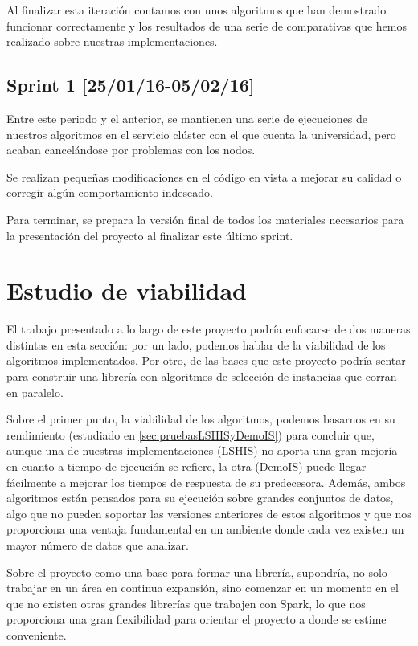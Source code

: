 Al finalizar esta iteración contamos con unos algoritmos que han demostrado funcionar correctamente y los resultados de una serie de comparativas que hemos realizado sobre nuestras implementaciones.

\subsection{Sprint 1 [25/01/16-05/02/16]}

Entre este periodo y el anterior, se mantienen una serie de ejecuciones de nuestros algoritmos en el servicio clúster con el que cuenta la universidad, pero acaban cancelándose por problemas con los nodos.

Se realizan pequeñas modificaciones en el código en vista a mejorar su calidad o corregir algún comportamiento indeseado.

Para terminar, se prepara la versión final de todos los materiales necesarios para la presentación del proyecto al finalizar este último sprint.


\section{Estudio de viabilidad}

El trabajo presentado a lo largo de este proyecto podría enfocarse de dos maneras distintas en esta sección: por un lado, podemos hablar de la viabilidad de los algoritmos implementados. Por otro, de las bases que este proyecto podría sentar para construir una librería con algoritmos de selección de instancias que corran en paralelo.

Sobre el primer punto, la viabilidad de los algoritmos, podemos basarnos en su rendimiento (estudiado en \ref{sec:pruebasLSHISyDemoIS}) para concluir que, aunque una de nuestras implementaciones (LSHIS) no aporta una gran mejoría en cuanto a tiempo de ejecución se refiere, la otra (DemoIS) puede llegar fácilmente a mejorar los tiempos de respuesta de su predecesora. Además, ambos algoritmos están pensados para su ejecución sobre grandes conjuntos de datos, algo que no pueden soportar las versiones anteriores de estos algoritmos y que nos proporciona una ventaja fundamental en un ambiente donde cada vez existen un mayor número de datos que analizar.

Sobre el proyecto como una base para formar una librería, supondría, no solo trabajar en un área en continua expansión, sino comenzar en un momento en el que no existen otras grandes librerías que trabajen con Spark, lo que nos proporciona una gran flexibilidad para orientar el proyecto a donde se estime conveniente.

